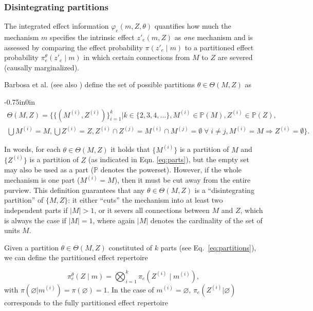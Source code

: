 \documentclass[preprints, article, accept, pdftex, moreauthors, letterpaper]{Definitions/mdpi}
\renewcommand{\=}[1]{\stackrel{#1}{=}} %
\newcommand{\p}{\theta} %
\newcommand{\Part}{\Theta}
\renewcommand{\O}{\emptyset}
\newcommand{\powerset}{\mathbb{P}}
\renewcommand{\*}{\otimes}%
\begin{document}
\subsubsection{Disintegrating partitions}
The integrated effect information $\varphi_e(m,Z, \theta)$ quantifies how much the mechanism $m$ specifies the intrinsic effect $z'_e(m,Z)$ as \textit{one} mechanism and is assessed by comparing the effect probability $\pi(z'_e\mid m)$ to a partitioned effect probability $\pi^\p_e(z'_e\mid m)$ in which certain connections from $M$ to $Z$ are severed (causally marginalized).

Barbosa et al. \cite{Barbosa2021} (see also \cite{Albantakis2019, Albantakis2022_4_0}) define the set of possible partitions $\p \in \Part(M,Z)$ as

\begin{adjustwidth}{-0.75in}{0in}
\begin{multline}
\label{eq:partitions}
\Part(M,Z) = \Bigg\{ \{(M^{(i)}, Z^{(i)})\}_{i=1}^{k} \Bigg\vert k \in \{2,3,4,\ldots\}, M^{(i)} \in \powerset(M), Z^{(i)} \in \powerset(Z), 
\\ 
\bigcup M^{(i)} = M, \bigcup Z^{(i)} = Z, 
Z^{(i)} \cap Z^{(j)} = M^{(i)} \cap M^{(j)} = \O \; \forall \; i \neq j, M^{(i)} = M \Longrightarrow Z^{(i)} = \O\Bigg\}.
\end{multline}
\end{adjustwidth}
%
In words, for each $\p \in \Part(M,Z)$ it holds that $\{M^{(i)}\}$ is a partition of $M$ and $\{Z^{(i)}\}$ is a partition of $Z$ (as indicated in Eqn. \eqref{eq:parts}), but the empty set may also be used as a part ($\powerset$ denotes the powerset). However, if the whole mechanism is one part ($M^{(i)} = M$), then it must be cut away from the entire purview. This definition guarantees that any $\p \in \Part(M,Z)$ is a ``disintegrating partition'' of $\{M,Z\}$: it either ``cuts'' the mechanism into at least two independent parts if $|M| > 1$, or it severs all connections between $M$ and $Z$, which is always the case if $|M| = 1$, where again $|M|$ denotes the cardinality of the set of units $M$.

Given a partition $\p \in \Part(M,Z)$ constituted of $k$ parts (see Eq.~\eqref{eq:partitions}), we can define the partitioned effect repertoire

\begin{equation}
\label{eq:partitioned_effect}
\pi_e^\p(Z \mid m) = \bigotimes_{i = 1}^k \pi_e(Z^{(i)} \mid m^{(i)}), 
\end{equation}
%
with $\pi(\varnothing|m^{(i)}) = \pi(\varnothing) = 1$. In the case of $m^{(i)} = \varnothing$,  $\pi_e(Z^{(i)}|\varnothing)$ corresponds to the fully partitioned effect repertoire
\end{document}
